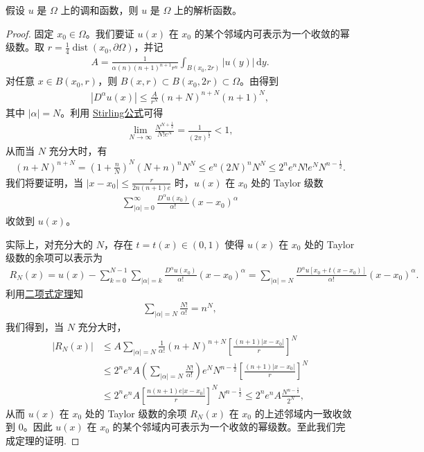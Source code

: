 \documentclass[../../main.tex]{subfiles}%
\begin{document}
\begin{theorem}
假设 $u$ 是 $\Omega$ 上的调和函数，则 $u$ 是 $\Omega$ 上的解析函数。
\end{theorem}
\begin{proof}
固定 $x_0\in\Omega$。我们要证 $u(x)$ 在 $x_0$ 的某个邻域内可表示为一个收敛的幂级数。取 $r=\frac{1}{4}\operatorname{dist}(x_0,\partial\Omega)$，并记
\begin{align*}
A = \frac{1}{\alpha(n)(n+1)^{n+1}r^n} \int_{B(x_0,2r)} |u(y)|\,\mathrm{d}y.
\end{align*}
对任意 $x\in B(x_0,r)$，则 $B(x,r)\subset B(x_0,2r)\subset\Omega$。由得到
\begin{align*}
|D^\alpha u(x)| \leqslant \frac{A}{r^N}(n+N)^{n+N}(n+1)^N,
\end{align*}
其中 $|\alpha|=N$。利用 \hyperref[Basis of Analytics-theorem:Stirling公式]{Stirling公式}可得
\begin{align*}
\lim_{N\to\infty} \frac{N^{N+\frac{1}{2}}}{N!e^N} = \frac{1}{(2\pi)^{\frac{1}{2}}} < 1,
\end{align*}
从而当 $N$ 充分大时，有
\begin{align*}
(n+N)^{n+N} = \left(1+\frac{n}{N}\right)^N (N+n)^n N^N 
\leqslant e^n (2N)^n N^N \leqslant 2^n e^n N!e^N N^{n-\frac{1}{2}}.
\end{align*}
我们将要证明，当
$|x-x_0| \leqslant \frac{r}{2n(n+1)e}$
时，$u(x)$ 在 $x_0$ 处的 Taylor 级数
\begin{align*}
\sum_{|\alpha|=0}^{\infty} \frac{D^\alpha u(x_0)}{\alpha!}(x-x_0)^\alpha
\end{align*}
收敛到 $u(x)$。

实际上，对充分大的 $N$，存在 $t=t(x)\in(0,1)$ 使得 $u(x)$ 在 $x_0$ 处的 Taylor 级数的余项可以表示为
\begin{align*}
R_N(x) = u(x) - \sum_{k=0}^{N-1}\sum_{|\alpha|=k} \frac{D^\alpha u(x_0)}{\alpha!}(x-x_0)^\alpha 
= \sum_{|\alpha|=N} \frac{D^\alpha u[x_0+t(x-x_0)]}{\alpha!}(x-x_0)^\alpha.
\end{align*}
利用\hyperref[Basis of Analytics-theorem:组合公式-二项式定理]{二项式定理}知
\begin{align*}
\sum_{|\alpha|=N}\frac{N!}{\alpha!} = n^N,
\end{align*}
我们得到，当 $N$ 充分大时，
\begin{align*}
|R_N(x)| &\leqslant A\sum_{|\alpha|=N} \frac{1}{\alpha!}(n+N)^{n+N}\left[\frac{(n+1)|x-x_0|}{r}\right]^N \\
&\leqslant 2^n e^n A \left(\sum_{|\alpha|=N}\frac{N!}{\alpha!}\right) e^N N^{n-\frac{1}{2}} \left[\frac{(n+1)|x-x_0|}{r}\right]^N \\
&\leqslant 2^n e^n A \left[\frac{n(n+1)e|x-x_0|}{r}\right]^N N^{n-\frac{1}{2}} \leqslant 2^n e^n A \frac{N^{n-\frac{1}{2}}}{2^N},
\end{align*}
从而 $u(x)$ 在 $x_0$ 处的 Taylor 级数的余项 $R_N(x)$ 在 $x_0$ 的上述邻域内一致收敛到 $0$。因此 $u(x)$ 在 $x_0$ 的某个邻域内可表示为一个收敛的幂级数。至此我们完成定理的证明.
\end{proof}
\end{document}
